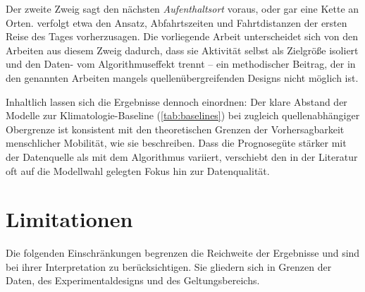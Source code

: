 Der zweite Zweig sagt den nächsten \textit{Aufenthaltsort} voraus, oder gar eine Kette an Orten. \Textcite{lindroth2024online} verfolgt etwa den Ansatz, Abfahrtszeiten und Fahrtdistanzen der ersten Reise des Tages vorherzusagen. Die vorliegende Arbeit unterscheidet sich von den Arbeiten aus diesem Zweig dadurch, dass sie Aktivität selbst als Zielgröße isoliert und den Daten- vom Algorithmuseffekt trennt -- ein methodischer Beitrag, der in den genannten Arbeiten mangels quellenübergreifenden Designs nicht möglich ist.

Inhaltlich lassen sich die Ergebnisse dennoch einordnen: Der klare Abstand der Modelle zur Klimatologie-Baseline (\cref{tab:baselines}) bei zugleich quellenabhängiger Obergrenze ist konsistent mit den theoretischen Grenzen der Vorhersagbarkeit menschlicher Mobilität, wie sie \textcite{song2010limits} beschreiben. Dass die Prognosegüte stärker mit der Datenquelle als mit dem Algorithmus variiert, verschiebt den in der Literatur oft auf die Modellwahl gelegten Fokus hin zur Datenqualität.

\section{Limitationen}
\label{sec:limitationen}

Die folgenden Einschränkungen begrenzen die Reichweite der Ergebnisse und sind bei ihrer Interpretation zu berücksichtigen. Sie gliedern sich in Grenzen der Daten, des Experimentaldesigns und des Geltungsbereichs.


